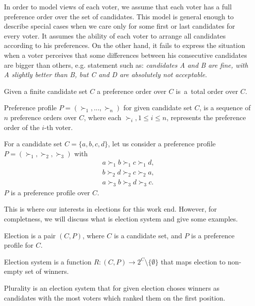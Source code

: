 In order to model views of each voter,
we assume that each voter has a full preference order over the set of candidates.
This model is general enough to describe special cases
when we care only for some first or last candidates for every voter.
It assumes the ability of each voter to arrange all candidates according to his preferences.
On the other hand, it fails to express the situation when a voter perceives that some differences
between his consecutive candidates are bigger than others, e.g. statement such as:
\textit{candidates A and B are fine, with A slightly better than B, but C and D are absolutely not acceptable}.

\begin{defn}
Given a finite candidate set $C$ a preference order over $C$
is~a~total order over $C$.
\end{defn}

\begin{defn}
Preference profile $P = (\succ_1, ... , \succ_n)$ for given candidate set $C$,
is a sequence of $n$ preference orders over $C$,
where each $\succ_i, 1 \leq i \leq n$, represents the preference order of the $i$-th voter.
\end{defn}

\begin{exmp}
For a candidate set $C = \{a, b, c, d\}$,
let us consider a preference profile $P = (\succ_1, \succ_2, \succ_3)$ with
\begin{align*}
a \succ_1 b \succ_1 c \succ_1 d, \\
b \succ_2 d \succ_2 c \succ_2 a,	\\
a \succ_3 b \succ_3 d \succ_3 c.
\end{align*}
$P$ is a preference profile over $C$.
\end{exmp}

This is where our interests in elections for this work end.
However, for completness, we will discuss what is election system and give some examples.

\begin{defn}[election]
Election is a pair $(C, P)$, where $C$ is a candidate set, and $P$ is a preference profile for $C$.
\end{defn}

\begin{defn}
Election system is a function $R : (C,P) \rightarrow 2^{C} \setminus \{\emptyset\}$
that maps election to non-empty set of winners.
\end{defn}

\begin{exmp}[plurality]
Plurality is an election system that for given election choses winners as candidates
with the most voters which ranked them on the first position.
\end{exmp}
